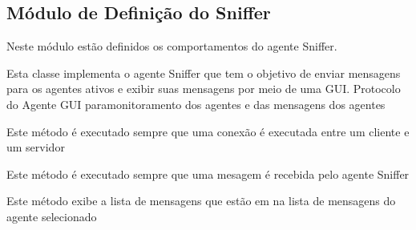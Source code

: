 \documentclass[letterpaper,10pt,brazil]{sphinxmanual}
\begin{document}
\label{api:module-pade.core.sniffer}

\subsection{Módulo de Definição do Sniffer}
\label{api:modulo-de-definicao-do-sniffer}
Neste módulo estão definidos os comportamentos do agente
Sniffer.

\begin{fulllineitems}
\label{api:pade.core.sniffer.Sniffer}
Esta classe implementa o agente Sniffer que tem o objetivo de
enviar mensagens para os agentes ativos e exibir suas mensagens
por meio de uma GUI.
Protocolo do Agente GUI paramonitoramento dos agentes
e das mensagens dos agentes

\begin{fulllineitems}
\label{api:pade.core.sniffer.Sniffer.connectionMade}
Este método é executado sempre que uma conexão é executada entre
um cliente e um servidor

\end{fulllineitems}


\begin{fulllineitems}
\label{api:pade.core.sniffer.Sniffer.lineReceived}
Este método é executado sempre que uma mesagem é recebida pelo agente Sniffer

\end{fulllineitems}


\begin{fulllineitems}
\label{api:pade.core.sniffer.Sniffer.show_messages}
Este método exibe a lista de mensagens que estão em na lista de mensagens do agente selecionado

\end{fulllineitems}


\end{fulllineitems}
\end{document}
